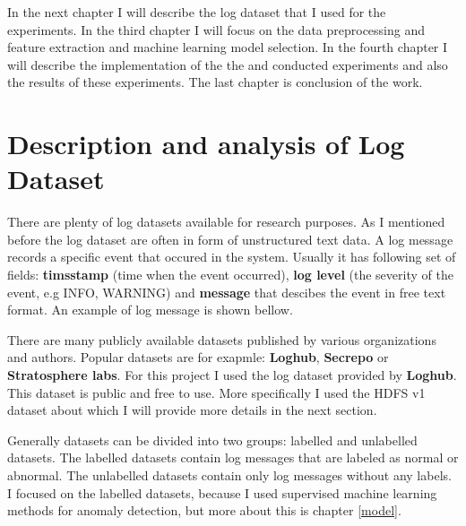 In the next chapter I will describe the log dataset that I used for the experiments. In the third chapter I will focus on the data preprocessing and feature extraction and machine learning model selection.
In the fourth chapter I will describe the implementation of the the and conducted experiments and also the results of these experiments. The last chapter is conclusion of the work.

\chapter{Description and analysis of Log Dataset}

There are plenty of log datasets available for research purposes. As I mentioned before the log dataset are often in form of unstructured text data.
A log message records a specific event that occured in the system. Usually it has following set of fields: \textbf{timsstamp} (time when the event occurred), \textbf{log level} (the severity
of the event, e.g INFO, WARNING) and \textbf{message} that descibes the event in free text format. An example of log message is shown bellow.

\begin{center}


\end{center}

There are many publicly available datasets published by various organizations and authors. Popular datasets are for exapmle: \textbf{Loghub}, %
\textbf{Secrepo} or \textbf{Stratosphere labs}. For this project I used the log dataset provided by \textbf{Loghub}. This dataset is public and free to use. 
More specifically I used the HDFS v1 dataset about which I will provide more details in the next section.

Generally datasets can be divided into two groups: labelled and unlabelled datasets. The labelled datasets contain log messages that are labeled as normal or abnormal. The unlabelled datasets contain only log messages without any labels.
I focused on the labelled datasets, because I used supervised machine learning methods for anomaly detection, but more about this is chapter \ref{model}.


